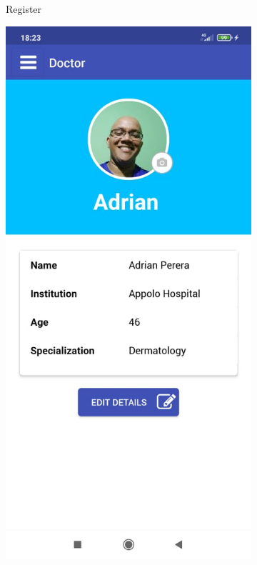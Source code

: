 \begin{figure}
\begin{subfigure}[b]{0.125\textwidth}
        \caption{Register}
        \label{fig:register}
    \end{subfigure}
    \hfill %
    \begin{subfigure}[b]{0.125\textwidth}
        \includegraphics[width=\textwidth]{figs/mobapp/img7.jpeg}

\end{subfigure}
\end{figure}

